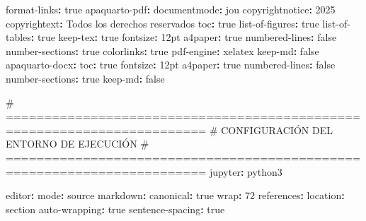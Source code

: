 \documentclass[
  doc,
  floatsintext,
  longtable,
  a4paper,
  nolmodern,
  notxfonts,
  notimes,
  12pt,
  colorlinks=true,linkcolor=blue,citecolor=blue,urlcolor=blue]{apa7}
\newenvironment{Shaded}{\begin{snugshade}}{\end{snugshade}}
\newcommand{\AttributeTok}[1]{\textcolor[rgb]{0.40,0.45,0.13}{#1}}
\newcommand{\CharTok}[1]{\textcolor[rgb]{0.13,0.47,0.30}{#1}}
\newcommand{\CommentTok}[1]{\textcolor[rgb]{0.37,0.37,0.37}{#1}}
\newcommand{\DecValTok}[1]{\textcolor[rgb]{0.68,0.00,0.00}{#1}}
\newcommand{\FunctionTok}[1]{\textcolor[rgb]{0.28,0.35,0.67}{#1}}
\newcommand{\KeywordTok}[1]{\textcolor[rgb]{0.00,0.23,0.31}{\textbf{#1}}}
\begin{document}
\begin{Shaded}
\begin{Highlighting}[]
\AttributeTok{    }\FunctionTok{format{-}links}\KeywordTok{:}\AttributeTok{ }\CharTok{true}
\AttributeTok{    }
\AttributeTok{  }\FunctionTok{apaquarto{-}pdf}\KeywordTok{:}
\AttributeTok{    }\FunctionTok{documentmode}\KeywordTok{:}\AttributeTok{ jou}
\AttributeTok{    }\FunctionTok{copyrightnotice}\KeywordTok{:}\AttributeTok{ }\DecValTok{2025}
\AttributeTok{    }\FunctionTok{copyrightext}\KeywordTok{:}\AttributeTok{ Todos los derechos reservados}
\AttributeTok{    }\FunctionTok{toc}\KeywordTok{:}\AttributeTok{ }\CharTok{true}
\AttributeTok{    }\FunctionTok{list{-}of{-}figures}\KeywordTok{:}\AttributeTok{ }\CharTok{true}
\AttributeTok{    }\FunctionTok{list{-}of{-}tables}\KeywordTok{:}\AttributeTok{ }\CharTok{true}
\AttributeTok{    }\FunctionTok{keep{-}tex}\KeywordTok{:}\AttributeTok{ }\CharTok{true}
\AttributeTok{    }\FunctionTok{fontsize}\KeywordTok{:}\AttributeTok{ 12pt}
\AttributeTok{    }\FunctionTok{a4paper}\KeywordTok{:}\AttributeTok{ }\CharTok{true}
\AttributeTok{    }\FunctionTok{numbered{-}lines}\KeywordTok{:}\AttributeTok{ }\CharTok{false}
\AttributeTok{    }\FunctionTok{number{-}sections}\KeywordTok{:}\AttributeTok{ }\CharTok{true}
\AttributeTok{    }\FunctionTok{colorlinks}\KeywordTok{:}\AttributeTok{ }\CharTok{true}
\AttributeTok{    }\FunctionTok{pdf{-}engine}\KeywordTok{:}\AttributeTok{ xelatex}
\AttributeTok{    }\FunctionTok{keep{-}md}\KeywordTok{:}\AttributeTok{ }\CharTok{false}
\AttributeTok{    }
\AttributeTok{  }\FunctionTok{apaquarto{-}docx}\KeywordTok{:}
\AttributeTok{    }\FunctionTok{toc}\KeywordTok{:}\AttributeTok{ }\CharTok{true}
\AttributeTok{    }\FunctionTok{fontsize}\KeywordTok{:}\AttributeTok{ 12pt}
\AttributeTok{    }\FunctionTok{a4paper}\KeywordTok{:}\AttributeTok{ }\CharTok{true}
\AttributeTok{    }\FunctionTok{numbered{-}lines}\KeywordTok{:}\AttributeTok{ }\CharTok{false}
\AttributeTok{    }\FunctionTok{number{-}sections}\KeywordTok{:}\AttributeTok{ }\CharTok{true}
\AttributeTok{    }\FunctionTok{keep{-}md}\KeywordTok{:}\AttributeTok{ }\CharTok{false}

\CommentTok{\# ========================================================================}
\CommentTok{\# CONFIGURACIÓN DEL ENTORNO DE EJECUCIÓN}
\CommentTok{\# ========================================================================}
\FunctionTok{jupyter}\KeywordTok{:}\AttributeTok{ python3}

\FunctionTok{editor}\KeywordTok{:}
\AttributeTok{  }\FunctionTok{mode}\KeywordTok{:}\AttributeTok{ source}
\AttributeTok{  }\FunctionTok{markdown}\KeywordTok{:}
\AttributeTok{    }\FunctionTok{canonical}\KeywordTok{:}\AttributeTok{ }\CharTok{true}
\AttributeTok{    }\FunctionTok{wrap}\KeywordTok{:}\AttributeTok{ }\DecValTok{72}
\AttributeTok{    }\FunctionTok{references}\KeywordTok{:}
\AttributeTok{      }\FunctionTok{location}\KeywordTok{:}\AttributeTok{ section}
\AttributeTok{    }\FunctionTok{auto{-}wrapping}\KeywordTok{:}\AttributeTok{ }\CharTok{true}
\AttributeTok{    }\FunctionTok{sentence{-}spacing}\KeywordTok{:}\AttributeTok{ }\CharTok{true}


\end{Highlighting}
\end{Shaded}
\end{document}
